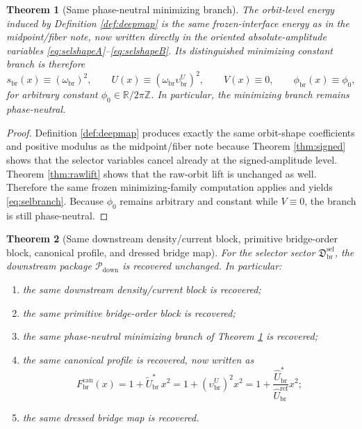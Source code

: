 \documentclass[11pt]{article}
\newcommand{\RespShapeEq}{\widetilde U_{\mathrm{br}}^{\ast}}
\newcommand{\RespRawRef}{\widehat U_{\mathrm{br}}^{\mathrm{ref}}}
\newcommand{\RespRawEq}{\widehat U_{\mathrm{br}}^{\ast}}
\newcommand{\RespVacPhase}{\phi_{\mathrm{br}}}
\newcommand{\CurvProfileCan}{F_{\mathrm{br}}^{\mathrm{can}}}
\newcommand{\DownPkg}{\mathscr P_{\mathrm{down}}}
\newcommand{\ScaleMod}{s_{\mathrm{br}}}
\newcommand{\AbsEqAmp}{\upsilon_{\mathrm{br}}^{U}}
\newcommand{\AbsScaleAmp}{\omega_{\mathrm{br}}}
\newcommand{\MidSelSector}{\mathfrak D_{\mathrm{br}}^{\mathrm{sel}}}
\newtheorem{theorem}{Theorem}
\begin{document}
\begin{theorem}[Same phase-neutral minimizing branch]
\label{thm:branch}
The orbit-level energy induced by Definition \ref{def:deepmap} is the same frozen-interface energy as in the midpoint/fiber note, now written directly in the oriented absolute-amplitude variables \eqref{eq:selshapeA}--\eqref{eq:selshapeB}. Its distinguished minimizing constant branch is therefore
\begin{equation}
\ScaleMod(x)\equiv(\AbsScaleAmp)^{2},
\qquad
U(x)\equiv(\AbsScaleAmp\AbsEqAmp)^{2},
\qquad
V(x)\equiv0,
\qquad
\RespVacPhase(x)\equiv\phi_{0},
\label{eq:selbranch}
\end{equation}
for arbitrary constant \(\phi_{0}\in\mathbb R/2\pi\mathbb Z\). In particular, the minimizing branch remains phase-neutral.
\end{theorem}

\begin{proof}
Definition \ref{def:deepmap} produces exactly the same orbit-shape coefficients and positive modulus as the midpoint/fiber note because Theorem \ref{thm:signed} shows that the selector variables cancel already at the signed-amplitude level. Theorem \ref{thm:rawlift} shows that the raw-orbit lift is unchanged as well. Therefore the same frozen minimizing-family computation applies and yields \eqref{eq:selbranch}. Because \(\phi_{0}\) remains arbitrary and constant while \(V\equiv0\), the branch is still phase-neutral.
\end{proof}

\begin{theorem}[Same downstream density/current block, primitive bridge-order block, canonical profile, and dressed bridge map]
\label{thm:downstream}
For the selector sector \(\MidSelSector\), the downstream package \(\DownPkg\) is recovered unchanged. In particular:
\begin{enumerate}
    \item the same downstream density/current block is recovered;
    \item the same primitive bridge-order block is recovered;
    \item the same phase-neutral minimizing branch of Theorem \ref{thm:branch} is recovered;
    \item the same canonical profile is recovered, now written as
    \begin{equation}
    \CurvProfileCan(x)
    =
    1+\RespShapeEq\,x^{2}
    =
    1+(\AbsEqAmp)^{2}x^{2}
    =
    1+\frac{\RespRawEq}{\RespRawRef}x^{2};
    \label{eq:selprofile}
    \end{equation}
    \item the same dressed bridge map is recovered.
\end{enumerate}
\end{theorem}
\end{document}
